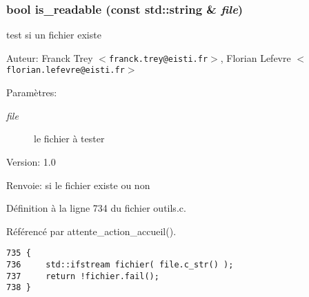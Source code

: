 \subsubsection{\setlength{\rightskip}{0pt plus 5cm}bool is\_\-readable (const std::string \& {\em file})}\label{outils_8h_740c0c834395069b060fe8d7e31653cd}


test si un fichier existe 

\begin{Desc}
\item[Auteur:]Franck Trey $<${\tt franck.trey@eisti.fr}$>$, Florian Lefevre $<${\tt florian.lefevre@eisti.fr}$>$\end{Desc}
\begin{Desc}
\item[Param\`{e}tres:]
\begin{description}
\item[{\em file}]le fichier \`{a} tester\end{description}
\end{Desc}
\begin{Desc}
\item[Version:]1.0 \end{Desc}
\begin{Desc}
\item[Renvoie:]si le fichier existe ou non \end{Desc}


D\'{e}finition \`{a} la ligne 734 du fichier outils.c.

R\'{e}f\'{e}renc\'{e} par attente\_\-action\_\-accueil().

\begin{Code}\begin{verbatim}735 { 
736     std::ifstream fichier( file.c_str() ); 
737     return !fichier.fail(); 
738 } 
\end{verbatim}\end{Code}


